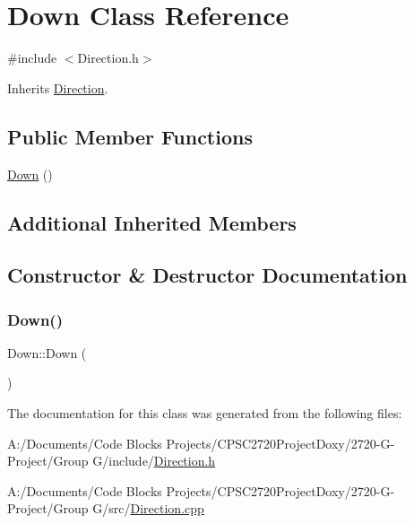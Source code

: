 \hypertarget{class_down}{}\section{Down Class Reference}
\label{class_down}


{\ttfamily \#include $<$Direction.\+h$>$}



Inherits \mbox{\hyperlink{class_direction}{Direction}}.

\subsection*{Public Member Functions}
\begin{DoxyCompactItemize}
\item 
\mbox{\hyperlink{class_down_a36efbf8cbe7c5208842e8e6217b6da08}{Down}} ()
\end{DoxyCompactItemize}
\subsection*{Additional Inherited Members}


\subsection{Constructor \& Destructor Documentation}
\mbox{\label{class_down_a36efbf8cbe7c5208842e8e6217b6da08}} 
\subsubsection{\texorpdfstring{Down()}{Down()}}
{\footnotesize\ttfamily Down\+::\+Down (\begin{DoxyParamCaption}{ }\end{DoxyParamCaption})}



The documentation for this class was generated from the following files\+:\begin{DoxyCompactItemize}
\item 
A\+:/\+Documents/\+Code Blocks Projects/\+C\+P\+S\+C2720\+Project\+Doxy/2720-\/\+G-\/\+Project/\+Group G/include/\mbox{\hyperlink{_direction_8h}{Direction.\+h}}\item 
A\+:/\+Documents/\+Code Blocks Projects/\+C\+P\+S\+C2720\+Project\+Doxy/2720-\/\+G-\/\+Project/\+Group G/src/\mbox{\hyperlink{_direction_8cpp}{Direction.\+cpp}}\end{DoxyCompactItemize}
